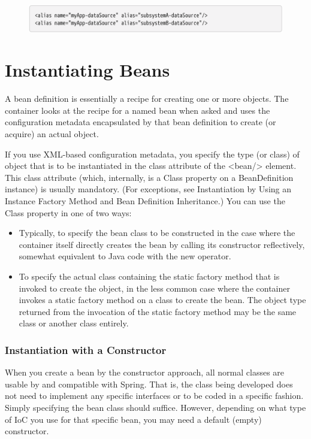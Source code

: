 \begin{figure}[ht]
    \centering
    \includegraphics[width=1\linewidth]{./Figure/IMG_code_13.png}
\end{figure}

\section{Instantiating Beans}
A bean definition is essentially a recipe for creating one or more objects. The container looks at the
recipe for a named bean when asked and uses the configuration metadata encapsulated by that
bean definition to create (or acquire) an actual object.

If you use XML-based configuration metadata, you specify the type (or class) of object that is to be
instantiated in the class attribute of the <bean/> element. This class attribute (which, internally, is a
Class property on a BeanDefinition instance) is usually mandatory. (For exceptions, see
Instantiation by Using an Instance Factory Method and Bean Definition Inheritance.) You can use
the Class property in one of two ways:


\begin{itemize}
    \item Typically, to specify the bean class to be constructed in the case where the container itself
    directly creates the bean by calling its constructor reflectively, somewhat equivalent to Java
    code with the new operator.
    \item To specify the actual class containing the static factory method that is invoked to create the
    object, in the less common case where the container invokes a static factory method on a class
    to create the bean. The object type returned from the invocation of the static factory method
    may be the same class or another class entirely.
\end{itemize}

\subsubsection{Instantiation with a Constructor}
When you create a bean by the constructor approach, all normal classes are usable by and
compatible with Spring. That is, the class being developed does not need to implement any specific
interfaces or to be coded in a specific fashion. Simply specifying the bean class should suffice.
However, depending on what type of IoC you use for that specific bean, you may need a default
(empty) constructor.

